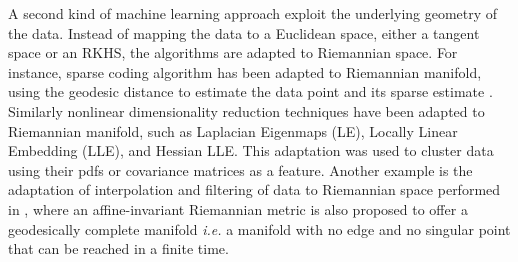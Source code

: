 A second kind of machine learning approach exploit the underlying geometry of the data.
Instead of mapping the data to a Euclidean space, either a tangent space or an RKHS, the algorithms are adapted to Riemannian space. 
For instance, sparse coding algorithm has been adapted to Riemannian manifold, using the geodesic distance to estimate the data point and its sparse estimate \citep{xie_nonlinear_2013}.
Similarly nonlinear dimensionality reduction techniques have been adapted to Riemannian manifold, such as Laplacian Eigenmaps (LE), Locally Linear Embedding (LLE), and Hessian LLE. 
This adaptation was used to cluster data using their pdfs \citep{goh_unsupervised_2008} or covariance matrices \citep{goh_clustering_2008} as a feature. 
Another example is the adaptation of interpolation and filtering of data to Riemannian space performed in \citep{pennec_riemannian_2006}, where an affine-invariant Riemannian metric is also proposed to offer a geodesically complete manifold \textit{i.e.} a manifold with no edge and no singular point that can be reached in a finite time.  

